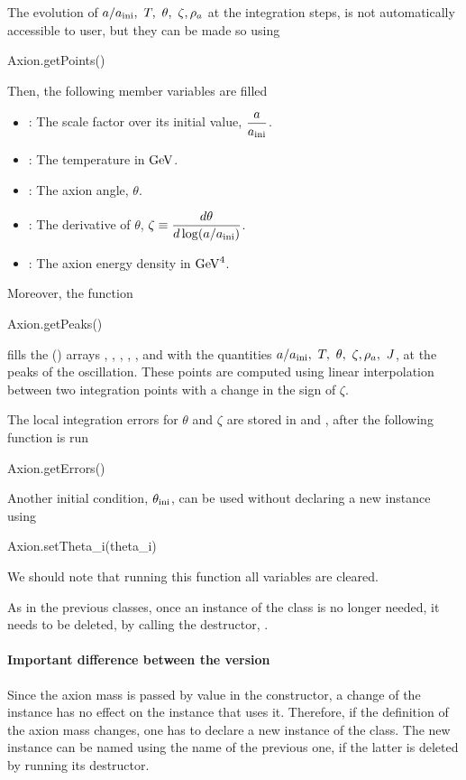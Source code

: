 \documentclass[11pt,a4paper]{article}
\begin{document}
The evolution of $a/\ai, \ T, \ \theta, \ \zeta, \rho_a$ at the integration steps, is not automatically accessible to user, but they can be made so using
%
\begin{py}
	Axion.getPoints()
\end{py}
%
Then, the following member variables are filled
%
\begin{itemize}
	\item {}: The scale factor over its initial value, $\dfrac{a}{a_{\rm ini}{}}$.
	\item {}: The temperature in ${\rm GeV}$.
	\item {}: The axion angle, $\theta$.
	\item {}: The derivative of $\theta$, $\zeta \equiv \dfrac{d \theta}{d \log (a/a_{\rm ini}{})}$.
	\item {}: The axion energy density in ${\rm GeV}^4$.
\end{itemize}

Moreover, the function
%
\begin{py}
	Axion.getPeaks()
\end{py}
%
fills the () arrays , , , , , and  with the quantities $a/a_{\rm ini}{}, \ T, \ \theta, \ \zeta, \rho_a, \ J$, at the peaks of the oscillation. These points are computed using linear interpolation between two integration points with a change in the sign of $\zeta$.


The local integration errors for $\theta$ and $\zeta$ are stored in	 and , after the following function is run
%
\begin{py}
	Axion.getErrors()
\end{py}
%



Another initial condition, $\theta_{\rm ini}{}$, can be used without declaring a new instance using
%
\begin{py}
	Axion.setTheta_i(theta_i)
\end{py}
%
We should note that running this function all variables are cleared. 

As in the previous \PY classes, once an instance of the  class is no longer needed, it needs to be deleted, by calling the destructor, . 

\paragraph{Important difference between the \CPP version} Since the axion mass is passed by value in the constructor, a change of the   instance has no effect on the  instance that uses it. Therefore, if the definition of the axion mass changes, one has to declare a new instance of the  class. The new instance can be named using the name of the previous one, if the latter is deleted by running its destructor.
\end{document}
